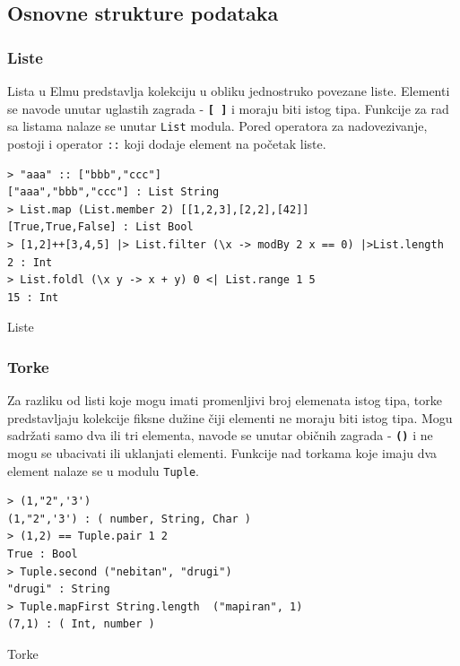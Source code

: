 \documentclass[12pt,oneside]{memoir}
\begin{document}
\subsection{Osnovne strukture podataka}
\subsubsection{Liste}
Lista u Elmu predstavlja kolekciju u obliku jednostruko povezane liste. Elementi se navode
unutar uglastih zagrada - \textbf{\texttt{[ ]}} i moraju biti istog tipa. Funkcije za rad
sa listama nalaze se unutar \texttt{List} modula. Pored operatora za nadovezivanje, postoji
i operator \texttt{::} koji dodaje element na početak liste. 
\begin{listing}[h]
\begin{verbatim}
> "aaa" :: ["bbb","ccc"]
["aaa","bbb","ccc"] : List String
> List.map (List.member 2) [[1,2,3],[2,2],[42]]
[True,True,False] : List Bool
> [1,2]++[3,4,5] |> List.filter (\x -> modBy 2 x == 0) |>List.length
2 : Int
> List.foldl (\x y -> x + y) 0 <| List.range 1 5 
15 : Int
\end{verbatim}
\caption{Liste}
\label{listing:liste}
\end{listing}
\subsubsection{Torke} 
Za razliku od listi koje mogu imati promenljivi broj elemenata istog tipa, torke 
predstavljaju kolekcije fiksne dužine čiji elementi ne moraju biti istog tipa. 
Mogu sadržati samo dva ili tri elementa, navode se unutar običnih zagrada -
\textbf{\texttt{()}} i ne mogu se ubacivati ili uklanjati elementi. Funkcije nad
torkama koje imaju dva element nalaze se u modulu \texttt{Tuple}.
\begin{listing}[h]
\begin{verbatim}
> (1,"2",'3')
(1,"2",'3') : ( number, String, Char )
> (1,2) == Tuple.pair 1 2
True : Bool
> Tuple.second ("nebitan", "drugi")
"drugi" : String
> Tuple.mapFirst String.length  ("mapiran", 1)
(7,1) : ( Int, number )
\end{verbatim}
\caption{Torke}
\label{listing:torke}
\end{listing}
\end{document}
